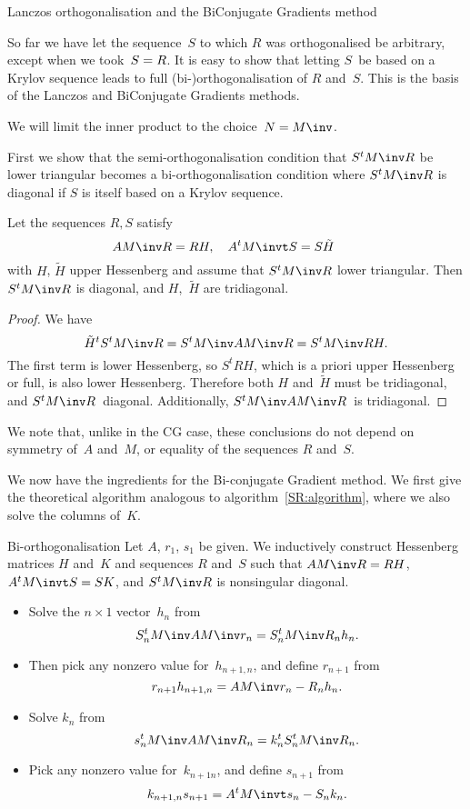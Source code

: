 \documentclass[11pt]{artikel3}
\begin{document}
\begin{Outline}
 {Lanczos orthogonalisation and the BiConjugate Gradients method}
\label{sec:bi-ortho}

So far we have let the sequence~$S$ to which $R$ was orthogonalised
be arbitrary, except when we took~$S=\nobreak R$. It is easy to show
that letting $S$~be based on a Krylov sequence leads to full
(bi-\nobreak)\discretionary{}{}{}orthogonalisation of $R$ and~$S$.
This is the basis of the Lanczos and BiConjugate Gradients methods.

We will limit the inner product to the choice~$N=M\inv$.

First we show that the semi-orthogonalisation condition that $S^tM\inv R$
be lower triangular becomes a bi-orthogonalisation condition
where $S^tM\inv R$ is diagonal if $S$ is itself based on a Krylov sequence.

\begin{lemma}\label{lemma:bi-orth}
Let the sequences $R,S$ satisfy
\[ AM\inv R=RH,\quad A^tM\invt S=S\tilde H\qquad \]
with $H$, $\tilde H$ upper Hessenberg and assume that $S^tM\inv R$
lower triangular. Then $S^tM\inv R$ is diagonal, and $H$,~$\tilde H$
are tridiagonal.
\end{lemma}
\begin{proof}
We have \[ \tilde H^tS^tM\inv R = S^tM\inv AM\inv R=S^tM\inv RH. \]
The first term is lower Hessenberg, so $S^tRH$, which is a priori 
upper Hessenberg or full,
is also lower Hessenberg. Therefore
both $H$ and~$\tilde H$ must be tridiagonal, and $S^tM\inv R$~diagonal.
Additionally, $S^tM\inv AM\inv R$~is tridiagonal.
\end{proof}

We note that, unlike in the CG case, these
conclusions do not depend on symmetry of~$A$ and~$M$,
or equality of the sequences $R$ and~$S$. 

We now have the ingredients for the Bi-conjugate Gradient method.
We first give the theoretical algorithm analogous to 
algorithm~\ref{SR:algorithm}, where we also solve the columns of~$K$.

\begin{algorithm}{Bi-orthogonalisation}\label{alg:RS-bicg}
Let $A$, $r_1$, $s_1$ be given.
We inductively construct Hessenberg matrices $H$ and~$K$
and sequences $R$ and~$S$ such that
$AM\inv R=\nobreak RH$, $A^tM\invt S=SK$,
and $S^tM\inv R$ is nonsingular diagonal.
\begin{itemize}
\item Solve the $n\times1$ vector~$h_n$ from
    \[ S_n^tM\inv AM\inv r_n=S_n^tM\inv R_nh_n.\]
\item Then pick any nonzero value for~$h_{n+1,n}$, and define $r_{n+1}$ from
    \[ r_{n+1}h_{n+1,n}=AM\inv r_n-R_nh_n.\]
\item Solve $k_n$ from
    \[s_n^tM\inv AM\inv R_n=k_n^tS_n^tM\inv R_n.\]
\item Pick any nonzero value for~$k_{n+1n}$, and define $s_{n+1}$ from
    \[k_{n+1,n}s_{n+1}=A^tM\invt s_n-S_nk_n.\]
\end{itemize}
\end{algorithm}


\end{Outline}
\end{document}
